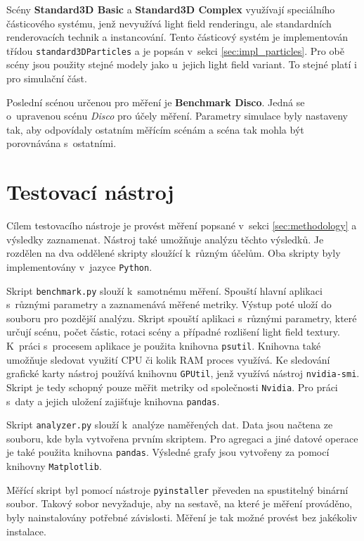 Scény \textbf{Standard3D Basic} a \textbf{Standard3D Complex} využívají speciálního částicového systému, jenž nevyužívá light field renderingu, ale standardních renderovacích technik a instancování. Tento částicový systém je implementován třídou \texttt{standard3DParticles} a je popsán v~sekci \ref{sec:impl_particles}. Pro obě scény jsou použity stejné modely jako u~jejich light field variant. To stejné platí i pro simulační část. 

Poslední scénou určenou pro měření je \textbf{Benchmark Disco}. Jedná se o~upravenou scénu \emph{Disco} pro účely měření. Parametry simulace byly nastaveny tak, aby odpovídaly ostatním měřícím scénám a scéna tak mohla být porovnávána s~ostatními. 
\section{Testovací nástroj}
\label{sec_benchmark_impl}
Cílem testovacího nástroje je provést měření popsané v~sekci \ref{sec:methodology} a výsledky zaznamenat. Nástroj také umožňuje analýzu těchto výsledků. Je rozdělen na dva oddělené skripty sloužící k~různým účelům. Oba skripty byly implementovány v~jazyce \texttt{Python}.

Skript \texttt{benchmark.py} slouží k~samotnému měření. Spouští hlavní aplikaci s~různými parametry a zaznamenává měřené metriky. Výstup poté uloží do souboru pro pozdější analýzu. Skript spouští aplikaci s~různými parametry, které určují scénu, počet částic, rotaci scény a případné rozlišení light field textury. K~práci s~procesem aplikace je použita knihovna \texttt{psutil}. Knihovna také umožňuje sledovat využití CPU či kolik RAM proces využívá. Ke sledování grafické karty nástroj používá knihovnu \texttt{GPUtil}, jenž využívá nástroj \texttt{nvidia-smi}. Skript je tedy schopný pouze měřit metriky od společnosti \texttt{Nvidia}. Pro práci s~daty a jejich uložení zajišťuje knihovna \texttt{pandas}.

Skript \texttt{analyzer.py} slouží k~analýze naměřených dat. Data jsou načtena ze souboru, kde byla vytvořena prvním skriptem. Pro agregaci a jiné datové operace je také použita knihovna \texttt{pandas}. Výsledné grafy jsou vytvořeny za pomocí knihovny \texttt{Matplotlib}.

Měřící skript byl pomocí nástroje \texttt{pyinstaller} převeden na spustitelný binární soubor. Takový sobor nevyžaduje, aby na sestavě, na které je měření prováděno, byly nainstalovány potřebné závislosti. Měření je tak možné provést bez jakékoliv instalace.



